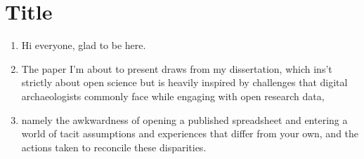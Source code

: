 \documentclass[12pt]{article}
\begin{document}
\pagestyle{fancy}

\section{Title}
\begin{enumerate}
  \item Hi everyone, glad to be here.
  \item The paper I'm about to present draws from my dissertation, which ins't strictly about open science but is heavily inspired by challenges that digital archaeologists commonly face while engaging with open research data,
  \item namely the awkwardness of opening a published spreadsheet and entering a world of tacit assumptions and experiences that differ from your own, and the actions taken to reconcile these disparities.
\end{enumerate}
\end{document}
